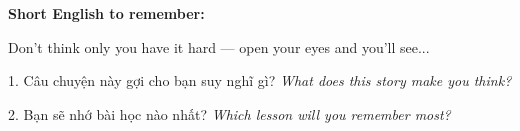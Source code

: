 \begin{ghinhoanh}
\textbf{Short English to remember:}

Don't think only you have it hard — open your eyes and you'll see...

\end{ghinhoanh}

\begin{tuhocnhanh}
1. Câu chuyện này gợi cho bạn suy nghĩ gì? \textit{What does this story make you think?}

2. Bạn sẽ nhớ bài học nào nhất? \textit{Which lesson will you remember most?}
\end{tuhocnhanh}
\ngancach
